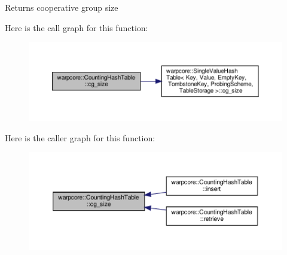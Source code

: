 \begin{DoxyReturn}{Returns}
cooperative group size 
\end{DoxyReturn}
Here is the call graph for this function\+:
\nopagebreak
\begin{figure}[H]
\begin{center}
\leavevmode
\includegraphics[width=350pt]{classwarpcore_1_1CountingHashTable_aeaf1b333eb176da987dee4d003e5dddc_cgraph}
\end{center}
\end{figure}
Here is the caller graph for this function\+:
\nopagebreak
\begin{figure}[H]
\begin{center}
\leavevmode
\includegraphics[width=350pt]{classwarpcore_1_1CountingHashTable_aeaf1b333eb176da987dee4d003e5dddc_icgraph}
\end{center}
\end{figure}
\mbox{\label{classwarpcore_1_1CountingHashTable_a90cb2cc9918717e35e8379437c6f78cf}} 
